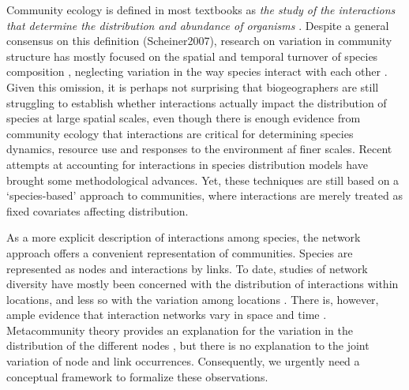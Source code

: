 \documentclass[12pt]{article}
\begin{document}
Community ecology is defined in most textbooks as \textit{the study of the
interactions that determine the distribution and abundance of organisms}
\citep{Krebs2001}. Despite a general consensus on this definition
(Scheiner2007), research on variation in community
structure has mostly focused on the spatial and temporal turnover of species composition
\citep{Anderson2011}, neglecting variation in the way species interact with
each other \citep{Poisot2015a}. Given this omission, it is perhaps not
surprising that biogeographers are still struggling to establish whether
interactions actually impact the distribution of species at large spatial
scales\citep{Wisz2012, Kissling2012}, even though there is enough evidence
from community ecology that interactions are critical for determining species
dynamics, resource use and responses to the environment af finer scales.
Recent attempts at accounting for interactions in species distribution models
\citep{Pollock2014, Pelissier2013} have brought some methodological advances.
Yet, these techniques are still based on a `species-based' approach to
communities, where interactions are merely treated as fixed covariates
affecting distribution.

As a more explicit description of interactions among species, the
network approach offers a convenient representation of communities. Species
are represented as nodes and interactions by links. To date, studies of
network diversity have mostly been concerned with the distribution of
interactions within locations, and less so with the variation among locations
\citep{Dunne2005, Bascompte2007, Ings2007, Kefi2012}. There is, however, 
ample evidence that interaction networks vary in space and time
\citep{Laliberte2010, Poisot2012, Albouy2014, Poisot2016, Trojelsgaard2015}. Metacommunity
theory provides an explanation for the variation in the distribution of the
different nodes \citep{Gravel2011c, Pillai2011}, but there is no explanation
to the joint variation of node and link occurrences. Consequently, we urgently need a
conceptual framework to formalize these observations.
\end{document}
